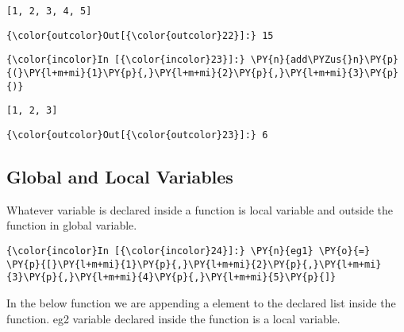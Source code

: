     \begin{Verbatim}[commandchars=\\\{\}]
[1, 2, 3, 4, 5]
    \end{Verbatim}

            \begin{Verbatim}[commandchars=\\\{\}]
{\color{outcolor}Out[{\color{outcolor}22}]:} 15
\end{Verbatim}
        
    \begin{Verbatim}[commandchars=\\\{\}]
{\color{incolor}In [{\color{incolor}23}]:} \PY{n}{add\PYZus{}n}\PY{p}{(}\PY{l+m+mi}{1}\PY{p}{,}\PY{l+m+mi}{2}\PY{p}{,}\PY{l+m+mi}{3}\PY{p}{)}
\end{Verbatim}

    \begin{Verbatim}[commandchars=\\\{\}]
[1, 2, 3]
    \end{Verbatim}

            \begin{Verbatim}[commandchars=\\\{\}]
{\color{outcolor}Out[{\color{outcolor}23}]:} 6
\end{Verbatim}
        
    \subsection{Global and Local
Variables}\label{global-and-local-variables}

    Whatever variable is declared inside a function is local variable and
outside the function in global variable.

    \begin{Verbatim}[commandchars=\\\{\}]
{\color{incolor}In [{\color{incolor}24}]:} \PY{n}{eg1} \PY{o}{=} \PY{p}{[}\PY{l+m+mi}{1}\PY{p}{,}\PY{l+m+mi}{2}\PY{p}{,}\PY{l+m+mi}{3}\PY{p}{,}\PY{l+m+mi}{4}\PY{p}{,}\PY{l+m+mi}{5}\PY{p}{]}
\end{Verbatim}

    In the below function we are appending a element to the declared list
inside the function. eg2 variable declared inside the function is a
local variable.

